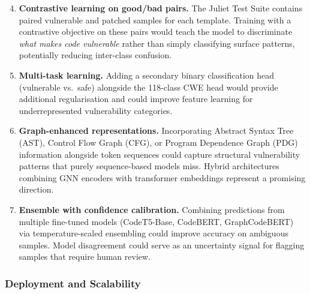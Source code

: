 \documentclass[conference]{IEEEtran}
\begin{document}
\begin{enumerate}
    \setcounter{enumi}{3}
    \item \textbf{Contrastive learning on good/bad pairs.}
          The Juliet Test Suite contains paired vulnerable and patched
          samples for each template.  Training with a contrastive objective
          on these pairs would teach the model to discriminate
          \emph{what makes code vulnerable} rather than simply classifying
          surface patterns, potentially reducing inter-class confusion.

    \item \textbf{Multi-task learning.}
          Adding a secondary binary classification head (vulnerable vs.\
          safe) alongside the 118-class CWE head would provide additional
          regularisation and could improve feature learning for
          underrepresented vulnerability categories.

    \item \textbf{Graph-enhanced representations.}
          Incorporating Abstract Syntax Tree (AST), Control Flow Graph
          (CFG), or Program Dependence Graph (PDG) information alongside
          token sequences could capture structural vulnerability patterns
          that purely sequence-based models miss.  Hybrid architectures
          combining GNN encoders with transformer embeddings represent a
          promising direction.

    \item \textbf{Ensemble with confidence calibration.}
          Combining predictions from multiple fine-tuned models (CodeT5-Base,
          CodeBERT, GraphCodeBERT) via temperature-scaled ensembling could
          improve accuracy on ambiguous samples.  Model disagreement could
          serve as an uncertainty signal for flagging samples that require
          human review.
\end{enumerate}

\subsubsection{Deployment and Scalability}
\end{document}
